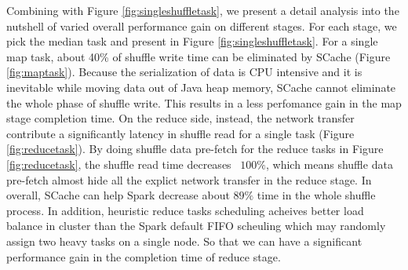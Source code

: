 Combining with Figure \ref{fig:singleshuffletask}, we present a detail analysis into the nutshell of varied overall performance gain on different stages. For each stage, we pick the median task and present in Figure \ref{fig:singleshuffletask}. For a single map task, about 40\% of shuffle write time can be eliminated by SCache (Figure \ref{fig:maptask}). Because the serialization of data is CPU intensive \cite{makingsense} and it is inevitable while moving data out of Java heap memory, SCache cannot eliminate the whole phase of shuffle write. This results in a less perfomance gain in the map stage completion time.
On the reduce side, instead, the network transfer contribute a significantly latency in shuffle read for a single task (Figure \ref{fig:reducetask}). By doing shuffle data pre-fetch for the reduce tasks in Figure \ref{fig:reducetask}, the shuffle read time decreases ~$100\%$, which means shuffle data pre-fetch almost hide all the explict network transfer in the reduce stage. In overall, SCache can help Spark decrease about $89\%$ time in the whole shuffle process. In addition, heuristic reduce tasks scheduling acheives better load balance in cluster than the Spark default FIFO scheuling which may randomly assign two heavy tasks on a single node. So that we can have a significant performance gain in the completion time of reduce stage. 

 
		
